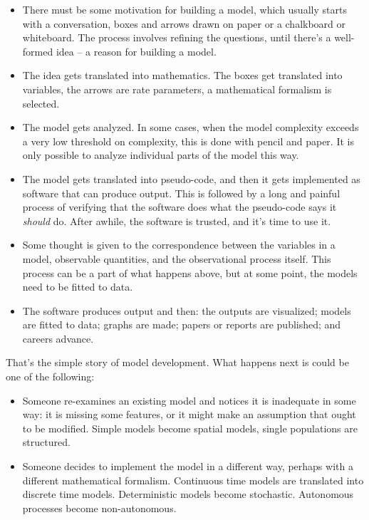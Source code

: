 \documentclass[
]{book}
\begin{document}
\begin{itemize}
\item
  There must be some motivation for building a model, which usually starts with a conversation, boxes and arrows drawn on paper or a chalkboard or whiteboard. The process involves refining the questions, until there's a well-formed idea -- a reason for building a model.
\item
  The idea gets translated into mathematics. The boxes get translated into variables, the arrows are rate parameters, a mathematical formalism is selected.
\item
  The model gets analyzed. In some cases, when the model complexity exceeds a very low threshold on complexity,
  this is done with pencil and paper. It is only possible to analyze individual parts of the model this way.
\item
  The model gets translated into pseudo-code, and then it gets implemented as software that can produce output. This is followed by a long and painful process of verifying that the software does what the pseudo-code says it \emph{should} do. After awhile, the software is trusted, and it's time to use it.
\item
  Some thought is given to the correspondence between the variables in a model, observable quantities, and the observational process itself. This process can be a part of what happens above, but at some point, the models need to be fitted to data.
\item
  The software produces output and then: the outputs are visualized; models are fitted to data; graphs are made; papers or reports are published; and careers advance.
\end{itemize}

That's the simple story of model development. What happens next is could be one of the following:

\begin{itemize}
\item
  Someone re-examines an existing model and notices it is inadequate in some way: it is missing some features, or it might make an assumption that ought to be modified. Simple models become spatial models, single populations are structured.
\item
  Someone decides to implement the model in a different way, perhaps with a different mathematical formalism. Continuous time models are translated into discrete time models. Deterministic models become stochastic. Autonomous processes become non-autonomous.
\end{itemize}
\end{document}
